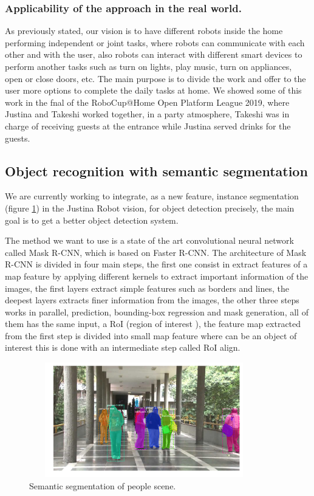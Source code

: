 \documentclass{llncs}
\begin{document}
\subsubsection{Applicability of the approach in the real world.} 

As previously stated, 
our vision is to have different robots inside the home performing independent or joint tasks, 
where robots can communicate with each other and with the user, 
 also robots can interact with different smart devices to perform another tasks such as turn on lights, play music, turn on appliances, open or close doors, etc.
The main purpose is to divide the work and offer to the user more options to complete the daily tasks at home.
We showed some of this work in the fnal of the RoboCup@Home Open Platform League 2019, where Justina and Takeshi worked together, in a party atmosphere, Takeshi was in charge of receiving guests at the entrance while Justina served drinks for the guests.


\subsection{Object recognition with semantic segmentation}\label{subsec:obj_recognition}

We are currently working to integrate, as a new feature, instance segmentation (figure \ref{fig:semanticsegmetation}) in the Justina Robot vision, for object detection  precisely, the main  goal is to get a better  object detection system. 

The method we want to use is a state of the art  convolutional neural network called Mask R-CNN, which is based on Faster R-CNN. The architecture of Mask R-CNN  is divided in four main steps, the first one  consist in extract features of a map feature by applying  different kernels to extract important information of the images, the first layers extract simple features such as borders and lines, the deepest layers extracts finer information from the images, the other three steps works in parallel, prediction, bounding-box regression and  mask generation, all of them has the same input, a RoI (region of interest ), the feature map extracted from the first step is divided into small map feature where can be an object of interest this is done with an intermediate step called RoI align. 

\begin{figure}[h]
	\centering
	\includegraphics[angle=0, height=5cm, width=10cm]{Figures/instance_segmentation.png}
	\caption{Semantic segmentation of people scene.}
	\label{fig:semanticsegmetation}
\end{figure}
\end{document}
